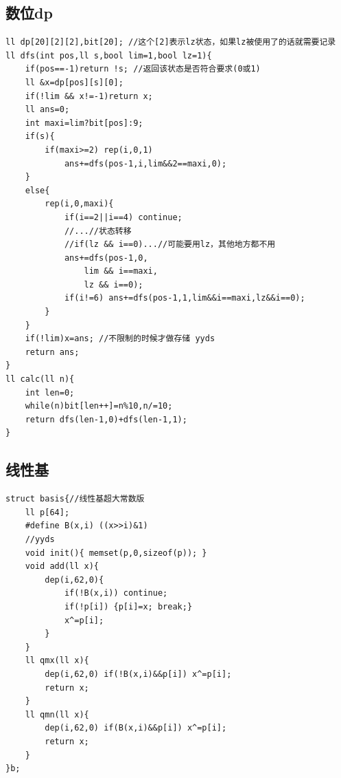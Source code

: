 \documentclass[a4]{ctexart}
\begin{document}
\subsection{数位dp}
\begin{lstlisting}
ll dp[20][2][2],bit[20]; //这个[2]表示lz状态，如果lz被使用了的话就需要记录
ll dfs(int pos,ll s,bool lim=1,bool lz=1){
	if(pos==-1)return !s; //返回该状态是否符合要求(0或1)
	ll &x=dp[pos][s][0];
	if(!lim && x!=-1)return x;
	ll ans=0;
	int maxi=lim?bit[pos]:9;
	if(s){
		if(maxi>=2) rep(i,0,1)
			ans+=dfs(pos-1,i,lim&&2==maxi,0);
	}
	else{
		rep(i,0,maxi){
			if(i==2||i==4) continue;
			//...//状态转移
			//if(lz && i==0)...//可能要用lz，其他地方都不用
			ans+=dfs(pos-1,0,
				lim && i==maxi,
				lz && i==0);
			if(i!=6) ans+=dfs(pos-1,1,lim&&i==maxi,lz&&i==0);
		}
	}
	if(!lim)x=ans; //不限制的时候才做存储 yyds
	return ans;
}
ll calc(ll n){
	int len=0;
	while(n)bit[len++]=n%10,n/=10;
	return dfs(len-1,0)+dfs(len-1,1);
}

\end{lstlisting}

\subsection{线性基}
\begin{lstlisting}
struct basis{//线性基超大常数版  
	ll p[64];
	#define B(x,i) ((x>>i)&1)
	//yyds
	void init(){ memset(p,0,sizeof(p)); }
	void add(ll x){
		dep(i,62,0){
			if(!B(x,i)) continue;
			if(!p[i]) {p[i]=x; break;}
			x^=p[i];
		}
	}
	ll qmx(ll x){
		dep(i,62,0) if(!B(x,i)&&p[i]) x^=p[i];
		return x;
	}
	ll qmn(ll x){
		dep(i,62,0) if(B(x,i)&&p[i]) x^=p[i];
		return x;
	}
}b;
\end{lstlisting}
\end{document}
